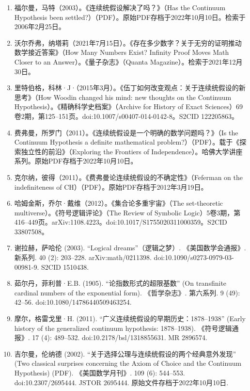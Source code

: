 \begin{enumerate}
\item 福尔曼，马特（2003）。《连续统假设解决了吗？》（Has the Continuum Hypothesis been settled?）（PDF）。原始PDF存档于2022年10月10日。检索于2006年2月25日。
\item 沃尔乔弗，纳塔莉（2021年7月15日）。《存在多少数字？关于无穷的证明推动数学接近答案》（How Many Numbers Exist? Infinity Proof Moves Math Closer to an Answer）。《量子杂志》（Quanta Magazine）。检索于2021年12月30日。
\item 里特伯格，科林·J·（2015年3月）。《伍丁如何改变观点：关于连续统假设的新思考》（How Woodin changed his mind: new thoughts on the Continuum Hypothesis）。《精确科学史档案》（Archive for History of Exact Sciences）69卷2期，第125–151页。doi:10.1007/s00407-014-0142-8。S2CID 122205863。
\item 费弗曼，所罗门（2011）。《连续统假设是一个明确的数学问题吗？》（Is the Continuum Hypothesis a definite mathematical problem?）（PDF）。载于《探索独立性的前沿》（Exploring the Frontiers of Independence）。哈佛大学讲座系列。原始PDF存档于2022年10月10日。
\item 克尔纳，彼得（2011）。《费弗曼论连续统假设的不确定性》（Feferman on the indefiniteness of CH）（PDF）。原始PDF存档于2012年3月19日。
\item 哈姆金斯，乔尔·戴维（2012）。《集合论多重宇宙》（The set-theoretic multiverse）。《符号逻辑评论》（The Review of Symbolic Logic）5卷3期，第416–449页。arXiv:1108.4223。doi:10.1017/S1755020311000359。S2CID 33807508。
\item 谢拉赫，萨哈伦 (2003). “Logical dreams”（逻辑之梦）. 《美国数学会通报》. 新系列. 40 (2): 203–228. arXiv:math/0211398. doi:10.1090/s0273-0979-03-00981-9. S2CID 1510438.
\item 茹尔丹，菲利普·E.B. (1905). “论指数形式的超限基数” (On transfinite cardinal numbers of the exponential form). 《哲学杂志》. 第六系列. 9 (49): 42–56. doi:10.1080/14786440509463254.
\item 摩尔，格雷戈里·H. (2011). “广义连续统假设的早期历史：1878–1938” (Early history of the generalized continuum hypothesis: 1878–1938). 《符号逻辑通报》. 17 (4): 489–532. doi:10.2178/bsl/1318855631. MR 2896574.
\item 吉尔曼，伦纳德 (2002). “关于选择公理与连续统假设的两个经典意外发现” (Two classical surprises concerning the Axiom of Choice and the Continuum Hypothesis) (PDF). 《美国数学月刊》. 109 (6): 544–553. doi:10.2307/2695444. JSTOR 2695444. 原始文件存档于2022年10月10日.
\end{enumerate}